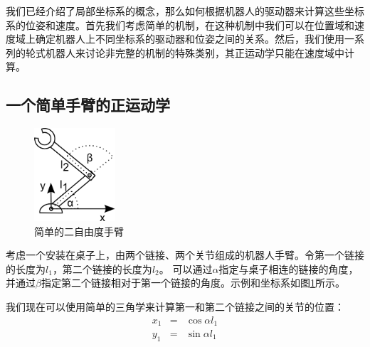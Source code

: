 我们已经介绍了局部坐标系的概念，那么如何根据机器人的驱动器来计算这些坐标系的位姿和速度。首先我们考虑简单的机制，在这种机制中我们可以在位置域和速度域上确定机器人上不同坐标系的驱动器和位姿之间的关系。然后，我们使用一系列的轮式机器人来讨论非完整的机制的特殊类别，其正运动学只能在速度域中计算。

\subsection{一个简单手臂的正运动学}
\begin{figure}[!htb]%
  \begin{center}
    \includegraphics[width=0.27\textwidth]{figs/fwk2dofarm}
  \end{center}
  \caption{简单的二自由度手臂}
  \label{fig:fwk2dofarm}
\end{figure}


考虑一个安装在桌子上，由两个链接、两个关节组成的机器人手臂。令第一个链接的长度为$l_1$，第二个链接的长度为$l_2$。 可以通过$\alpha$指定与桌子相连的链接的角度，并通过$\beta$指定第二个链接相对于第一个链接的角度。示例和坐标系如图\ref{fig:fwk2dofarm}所示。


我们现在可以使用简单的三角学来计算第一和第二个链接之间的关节的位置：
\begin{eqnarray}\label{eq:cosxl1}
x_1 &=&\cos \alpha l_1\\
y_1 &=&\sin \alpha l_1
\end{eqnarray}

